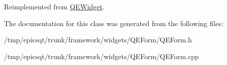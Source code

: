 Reimplemented from \hyperlink{classQEWidget_aad46c00865cd37a2221ea69fbaee8806}{QEWidget}.



The documentation for this class was generated from the following files:\begin{DoxyCompactItemize}
\item 
/tmp/epicsqt/trunk/framework/widgets/QEForm/QEForm.h\item 
/tmp/epicsqt/trunk/framework/widgets/QEForm/QEForm.cpp\end{DoxyCompactItemize}
